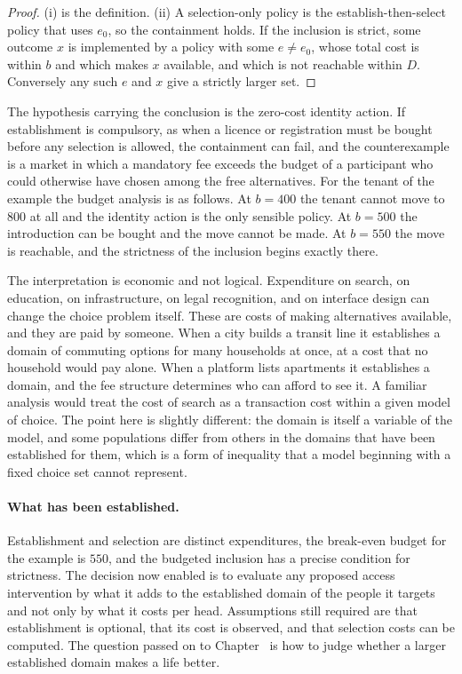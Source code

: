 \begin{proof}
(i) is the definition. (ii) A selection-only policy is the establish-then-select policy that uses $e_0$, so the containment holds. If the inclusion is strict, some outcome $x$ is implemented by a policy with some $e\ne e_0$, whose total cost is within $b$ and which makes $x$ available, and which is not reachable within $D$. Conversely any such $e$ and $x$ give a strictly larger set.
\end{proof}

The hypothesis carrying the conclusion is the zero-cost identity action. If establishment is compulsory, as when a licence or registration must be bought before any selection is allowed, the containment can fail, and the counterexample is a market in which a mandatory fee exceeds the budget of a participant who could otherwise have chosen among the free alternatives. For the tenant of the example the budget analysis is as follows. At $b=400$ the tenant cannot move to $800$ at all and the identity action is the only sensible policy. At $b=500$ the introduction can be bought and the move cannot be made. At $b=550$ the move is reachable, and the strictness of the inclusion begins exactly there.

The interpretation is economic and not logical. Expenditure on search, on education, on infrastructure, on legal recognition, and on interface design can change the choice problem itself. These are costs of making alternatives available, and they are paid by someone. When a city builds a transit line it establishes a domain of commuting options for many households at once, at a cost that no household would pay alone. When a platform lists apartments it establishes a domain, and the fee structure determines who can afford to see it. A familiar analysis would treat the cost of search as a transaction cost within a given model of choice. The point here is slightly different: the domain is itself a variable of the model, and some populations differ from others in the domains that have been established for them, which is a form of inequality that a model beginning with a fixed choice set cannot represent.

\paragraph{What has been established.} Establishment and selection are distinct expenditures, the break-even budget for the example is $550$, and the budgeted inclusion has a precise condition for strictness. The decision now enabled is to evaluate any proposed access intervention by what it adds to the established domain of the people it targets and not only by what it costs per head. Assumptions still required are that establishment is optional, that its cost is observed, and that selection costs can be computed. The question passed on to Chapter~ is how to judge whether a larger established domain makes a life better.


